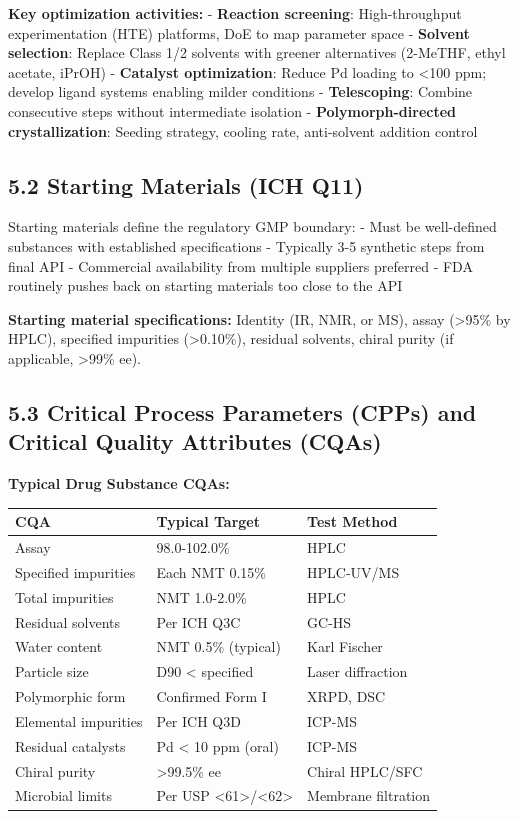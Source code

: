 \documentclass[
  11pt,
  a4paper,
]{report}
\begin{document}
\textbf{Key optimization activities:} - \textbf{Reaction screening}:
High-throughput experimentation (HTE) platforms, DoE to map parameter
space - \textbf{Solvent selection}: Replace Class 1/2 solvents with
greener alternatives (2-MeTHF, ethyl acetate, iPrOH) - \textbf{Catalyst
optimization}: Reduce Pd loading to \textless100 ppm; develop ligand
systems enabling milder conditions - \textbf{Telescoping}: Combine
consecutive steps without intermediate isolation -
\textbf{Polymorph-directed crystallization}: Seeding strategy, cooling
rate, anti-solvent addition control

\hypertarget{starting-materials-ich-q11}{%
\subsection{5.2 Starting Materials (ICH
Q11)}\label{starting-materials-ich-q11}}

Starting materials define the regulatory GMP boundary: - Must be
well-defined substances with established specifications - Typically 3-5
synthetic steps from final API - Commercial availability from multiple
suppliers preferred - FDA routinely pushes back on starting materials
too close to the API

\textbf{Starting material specifications:} Identity (IR, NMR, or MS),
assay (\textgreater95\% by HPLC), specified impurities
(\textgreater0.10\%), residual solvents, chiral purity (if applicable,
\textgreater99\% ee).

\hypertarget{critical-process-parameters-cpps-and-critical-quality-attributes-cqas}{%
\subsection{5.3 Critical Process Parameters (CPPs) and Critical Quality
Attributes
(CQAs)}\label{critical-process-parameters-cpps-and-critical-quality-attributes-cqas}}

\textbf{Typical Drug Substance CQAs:}

\begin{longtable}[]{@{}lll@{}}
\toprule
CQA & Typical Target & Test Method\tabularnewline
\midrule
\endhead
Assay & 98.0-102.0\% & HPLC\tabularnewline
Specified impurities & Each NMT 0.15\% & HPLC-UV/MS\tabularnewline
Total impurities & NMT 1.0-2.0\% & HPLC\tabularnewline
Residual solvents & Per ICH Q3C & GC-HS\tabularnewline
Water content & NMT 0.5\% (typical) & Karl Fischer\tabularnewline
Particle size & D90 \textless{} specified & Laser
diffraction\tabularnewline
Polymorphic form & Confirmed Form I & XRPD, DSC\tabularnewline
Elemental impurities & Per ICH Q3D & ICP-MS\tabularnewline
Residual catalysts & Pd \textless{} 10 ppm (oral) &
ICP-MS\tabularnewline
Chiral purity & \textgreater99.5\% ee & Chiral HPLC/SFC\tabularnewline
Microbial limits & Per USP
\textless61\textgreater/\textless62\textgreater{} & Membrane
filtration\tabularnewline
\bottomrule
\end{longtable}
\end{document}
